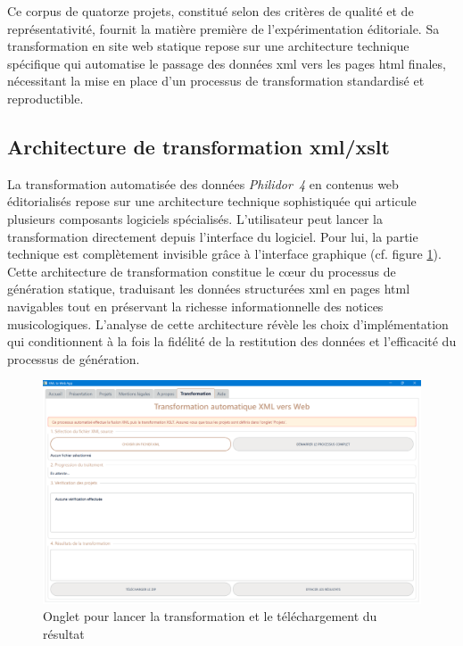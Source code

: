 Ce corpus de quatorze projets, constitué selon des critères de qualité et de représentativité, fournit la matière première de l'expérimentation éditoriale. Sa transformation en site web statique repose sur une architecture technique spécifique qui automatise le passage des données \gls{xml} vers les pages \gls{html} finales, nécessitant la mise en place d'un processus de transformation standardisé et reproductible.

\subsection{Architecture de transformation \gls{xml}/\gls{xslt}}

La transformation automatisée des données \textit{Philidor~4} en contenus web éditorialisés repose sur une architecture technique sophistiquée qui articule plusieurs composants logiciels spécialisés. L'utilisateur peut lancer la transformation directement depuis l'interface du logiciel. Pour lui, la partie technique est complètement invisible grâce à l'interface graphique (cf. figure \ref{appli-transformation}). Cette architecture de transformation constitue le cœur du processus de génération statique, traduisant les données structurées \gls{xml} en pages \gls{html} navigables tout en préservant la richesse informationnelle des notices musicologiques. L'analyse de cette architecture révèle les choix d'implémentation qui conditionnent à la fois la fidélité de la restitution des données et l'efficacité du processus de génération.

\begin{figure}[h]
	\caption{Onglet pour lancer la transformation et le téléchargement du résultat} \label{appli-transformation}
	\centering
	\includegraphics[width=\textwidth]{images/appli-onglet-transformation.png}
\end{figure}

